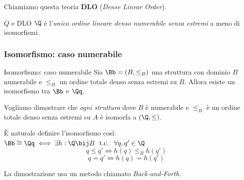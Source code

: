\documentclass[a4paper,11pt]{report}
\begin{document}
Chiamiamo questa teoria \textbf{DLO} (\textit{Dense Linear Order}).

\begin{thmframe}{\( Q \) e DLO}{}
    \( \Q \) è l'\textit{unico ordine lineare denso numerabile senza estremi} a meno di isomorfismi.
\end{thmframe}

\subsubsection{Isomorfismo: caso numerabile}

\begin{thmframe}{Isomorfismo: caso numerabile}{}
    Sia \( \Bb = (B, \leq_B) \) una struttura con dominio \( B \) numerabile e \( \leq_B \) un ordine totale denso senza estremi su \( B \). Allora esiste un isomorfismo tra \( \Bb\) e \(\Qq \).
\end{thmframe}

Vogliamo dimostrare che \textit{ogni struttura} dove \( B \) è numerabile e \( \leq_B \) è un ordine totale denso senza estremi su \( A \) è isomorfa a \( (\Q, \leq)  \).

\begin{gframe}{}
    È naturale definire l'isomorfismo così: \(\Bb \cong \Qq \iff \exists h : \Q \bij B \ \text{ t.c. } \ \forall q, q' \in \Q\)
    \[ q \leq q' \iff h(q) \leq_B h(q')\]
    \[ q = q' \iff h(q) = h(q')\]
\end{gframe}

La dimostrazione usa un metodo chiamato \textit{Back-and-Forth}.
\end{document}
